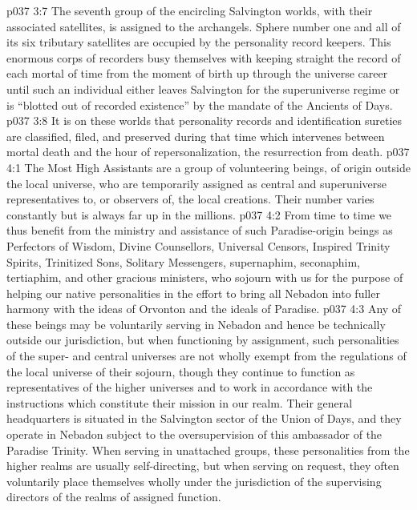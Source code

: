 \vs p037 3:7 \pc {} The seventh group of the encircling Salvington worlds, with their associated satellites, is assigned to the archangels. Sphere number one and all of its six tributary satellites are occupied by the personality record keepers. This enormous corps of recorders busy themselves with keeping straight the record of each mortal of time from the moment of birth up through the universe career until such an individual either leaves Salvington for the superuniverse regime or is “blotted out of recorded existence” by the mandate of the Ancients of Days.
\vs p037 3:8 It is on these worlds that personality records and identification sureties are classified, filed, and preserved during that time which intervenes between mortal death and the hour of repersonalization, the resurrection from death.
\vs p037 4:1 The Most High Assistants are a group of volunteering beings, of origin outside the local universe, who are temporarily assigned as central and superuniverse representatives to, or observers of, the local creations. Their number varies constantly but is always far up in the millions.
\vs p037 4:2 From time to time we thus benefit from the ministry and assistance of such Paradise\hyp{}origin beings as Perfectors of Wisdom, Divine Counsellors, Universal Censors, Inspired Trinity Spirits, Trinitized Sons, Solitary Messengers, supernaphim, seconaphim, tertiaphim, and other gracious ministers, who sojourn with us for the purpose of helping our native personalities in the effort to bring all Nebadon into fuller harmony with the ideas of Orvonton and the ideals of Paradise.
\vs p037 4:3 Any of these beings may be voluntarily serving in Nebadon and hence be technically outside our jurisdiction, but when functioning by assignment, such personalities of the super\hyp{} and central universes are not wholly exempt from the regulations of the local universe of their sojourn, though they continue to function as representatives of the higher universes and to work in accordance with the instructions which constitute their mission in our realm. Their general headquarters is situated in the Salvington sector of the Union of Days, and they operate in Nebadon subject to the oversupervision of this ambassador of the Paradise Trinity. When serving in unattached groups, these personalities from the higher realms are usually self\hyp{}directing, but when serving on request, they often voluntarily place themselves wholly under the jurisdiction of the supervising directors of the realms of assigned function.
